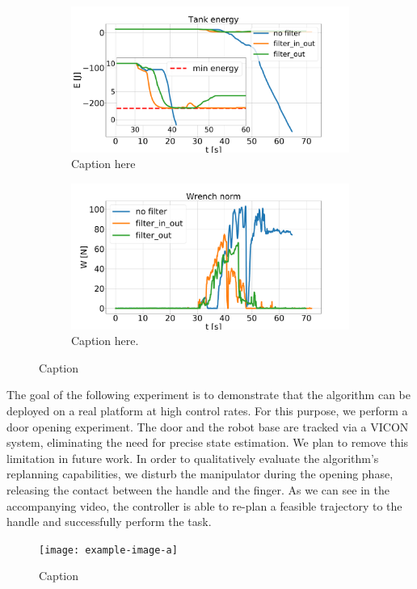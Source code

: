 \begin{figure}[t]
\centering
\hspace*{-0.0cm} 
\begin{subfigure}{\columnwidth}
    \includegraphics[width=\linewidth]{figures/hardware_experiments/tank_energy.pdf}
    \caption{Caption here}
\end{subfigure}
\hspace*{-0.0cm} 
\begin{subfigure}{\columnwidth}
    \includegraphics[width=\linewidth]{figures/hardware_experiments/wrench_norm.pdf}
    \caption{Caption here.}
\end{subfigure}
    \caption{Caption}
    \label{fig:constraint_experiment}
\end{figure}

The goal of the following experiment is to demonstrate that the algorithm can be deployed on a real platform at high control rates. For this purpose, we perform a door opening experiment. The door and the robot base are tracked via a VICON system, eliminating the need for precise state estimation. We plan to remove this limitation in future work. In order to qualitatively evaluate the algorithm's replanning capabilities, we disturb the manipulator during the opening phase, releasing the contact between the handle and the finger. As we can see in the accompanying video, the controller is able to re-plan a feasible trajectory to the handle and successfully perform the task. 

\begin{figure}[t]
    \centering
    \texttt{[image: example-image-a]}
    \caption{Caption}
    \label{fig:tank_experiment}
\end{figure}